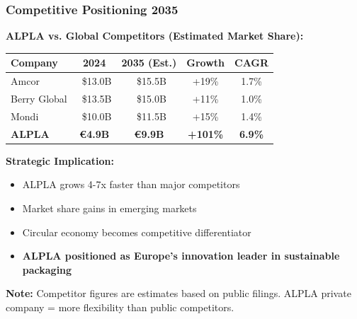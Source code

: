 \documentclass[aspectratio=169,12pt,xcolor=dvipsnames]{beamer}
\newcommand{\highlight}[1]{{\color{alpla_blue}\textbf{#1}}}
\begin{document}
\begin{frame}
  \frametitle{Competitive Positioning 2035}

  \textbf{ALPLA vs. Global Competitors (Estimated Market Share):}

  \vspace{0.5cm}

  \begin{center}
    \begin{tabular}{lcccc}
      \toprule
      \textbf{Company} & \textbf{2024} & \textbf{2035 (Est.)} & \textbf{Growth} & \textbf{CAGR} \\
      \midrule
      Amcor & ~\$13.0B & ~\$15.5B & +19\% & 1.7\% \\
      Berry Global & ~\$13.5B & ~\$15.0B & +11\% & 1.0\% \\
      Mondi & ~\$10.0B & ~\$11.5B & +15\% & 1.4\% \\
      \textbf{ALPLA} & \textbf{€4.9B} & \textbf{€9.9B} & \textbf{+101\%} & \textbf{6.9\%} \\
      \bottomrule
    \end{tabular}
  \end{center}

  \vspace{0.8cm}

  \textbf{Strategic Implication:}

  \begin{itemize}
    \item ALPLA grows 4-7x faster than major competitors
    \item Market share gains in emerging markets
    \item Circular economy becomes competitive differentiator
    \item \highlight{ALPLA positioned as Europe's innovation leader in sustainable packaging}
  \end{itemize}

  \vspace{0.5cm}

  \textbf{Note:} Competitor figures are estimates based on public filings. ALPLA private company = more flexibility than public competitors.

\end{frame}

\end{document}
